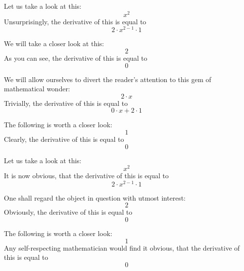 \documentclass{article}
\begin{document}
Let us take a look at this:
\begin{equation}
x ^{2 } 
\end{equation}
Unsurprisingly, the derivative of this is equal to
\begin{equation}
2 \cdot x ^{2 - 1 } \cdot 1 
\end{equation}

We will take a closer look at this:
\begin{equation}
2 
\end{equation}
As you can see, the derivative of this is equal to
\begin{equation}
0 
\end{equation}

We will allow ourselves to divert the reader's attention to this gem of mathematical wonder:
\begin{equation}
2 \cdot x 
\end{equation}
Trivially, the derivative of this is equal to
\begin{equation}
0 \cdot x + 2 \cdot 1 
\end{equation}

The following is worth a closer look:
\begin{equation}
1 
\end{equation}
Clearly, the derivative of this is equal to
\begin{equation}
0 
\end{equation}

Let us take a look at this:
\begin{equation}
x ^{2 } 
\end{equation}
It is now obvious, that the derivative of this is equal to
\begin{equation}
2 \cdot x ^{2 - 1 } \cdot 1 
\end{equation}

One shall regard the object in question with utmost interest:
\begin{equation}
2 
\end{equation}
Obviously, the derivative of this is equal to
\begin{equation}
0 
\end{equation}

The following is worth a closer look:
\begin{equation}
1 
\end{equation}
Any self-respecting mathematician would find it obvious, that the derivative of this is equal to
\begin{equation}
0 
\end{equation}
\end{document}

